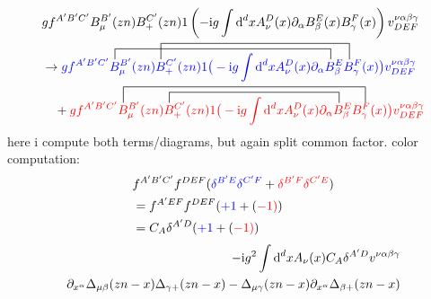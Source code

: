 \begin{align}
&
gf^{A'B'C'} B_\mu^{B'}(zn)B_+^{C'}(zn) \idm \left(-\imag g \int \ddx x A_\nu ^D (x) \partial_\alpha B_\beta^E(x) B_\gamma^F(x) \right) v^{\nu\alpha\beta\gamma}_{DEF}
\\
&\rightarrow
\contraction[2ex]{gf^{A'B'C'} }{B}{_\mu^{B'}(zn)B_+^{C'}(zn) \idm \big(-\imag g \int \ddx xA_\nu ^D (x) \partial_\alpha}{B}
\contraction[3ex]{gf^{A'B'C'} B_\mu^{B'}(zn)}{B}{_+^{C'}(zn) \idm \big(-\imag g \int \ddx xA_\nu ^D (x) \partial_\alpha B_\beta^E }{B}
{\color{blue}gf^{A'B'C'} B_\mu^{B'}(zn)B_+^{C'}(zn) \idm \big(-\imag g \int \ddx xA_\nu ^D (x) \partial_\alpha B_\beta^E B_\gamma^F(x) \big) v^{\nu\alpha\beta\gamma}_{DEF}}
\nl
+
\contraction[3ex]{gf^{A'B'C'} }{B}{\mu^{B'}(zn)B_+^{C'}(zn) \idm \big(-\imag g \int \ddx xA_\nu ^D (x) \partial_\alpha B_\beta^E}{B}
\contraction[2ex]{gf^{A'B'C'} B_\mu^{B'}(zn)}{B}{_+^{C'}(zn) \idm \big(-\imag g \int \ddx xA_\nu ^D (x) \partial_\alpha }{B}
{\color{red}
gf^{A'B'C'} B_\mu^{B'}(zn)B_+^{C'}(zn) \idm \big(-\imag g \int \ddx xA_\nu ^D (x) \partial_\alpha B_\beta^E B_\gamma^F(x) \big) v^{\nu\alpha\beta\gamma}_{DEF}}
\end{align}
here i compute both terms/diagrams, but again split common factor. 
color computation:
\begin{align}
	&f^{A'B'C'}f^{DEF} ({\color{blue}\delta^{B'E}\delta^{C'F}} +{\color{red}\delta^{B'F}\delta^{C'E}})
	\\
	&=
	f^{A'EF}f^{DEF} ({\color{blue}+1} +{(\color{red}-1)})
	\\
	&=
	C_A \delta^{A'D} ({\color{blue}+1} +{(\color{red}-1)})
\end{align}
\begin{align}
	-\text{i} g^2 \int \text{d} ^d x A_\nu(x) 	C_A \delta^{A'D}v^{\nu\alpha\beta\gamma}
	\\
	\partial_{x^\alpha}\Delta_{\mu \beta}(zn-x) \Delta_{\gamma +} (zn-x)
	-
	\Delta_{\mu \gamma}(zn-x) \partial_{x^\alpha}\Delta_{\beta +}(zn-x)
\end{align}

